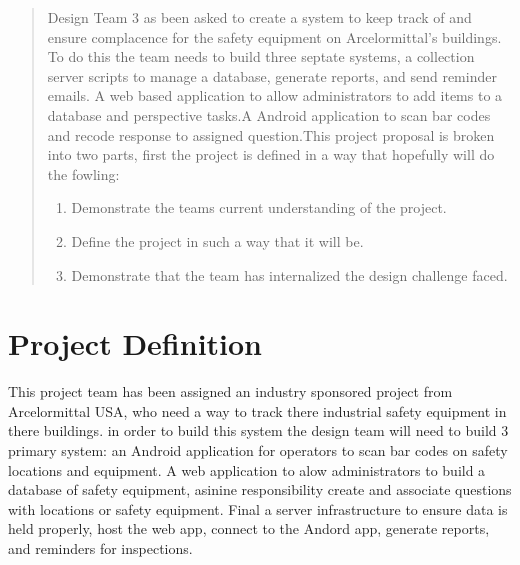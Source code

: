\documentclass[Letter,11pt]{article}
\begin{document}
	
	\begin{abstract}
		Design Team 3 as been asked to create a system to keep track of  and ensure complacence for the safety equipment on Arcelormittal's buildings. To do this the team needs to build three septate systems, a collection server scripts to manage a database, generate reports, and send reminder emails. A web based application to allow administrators to add items to a database and perspective tasks.A Android application to scan bar codes and recode response to assigned question.This project proposal is broken into two parts, first the project is defined in a way that hopefully will do the fowling:
		\begin{enumerate}
			\item Demonstrate the teams current understanding of the project.
			\item Define the project in such a way that it will be.
			\item Demonstrate that the team has internalized the design challenge faced.
		\end{enumerate}
	\end{abstract}

\section{Project Definition}\label{def}
	This project team has been assigned an industry sponsored project from Arcelormittal USA, who need a way to track there industrial safety equipment in there buildings. in order to build this system the design team will need to build 3 primary system: an Android application for operators to scan bar codes on safety locations and equipment. A web application to alow administrators to build a database of safety equipment, asinine responsibility create and associate questions with locations or safety equipment. Final a server infrastructure to ensure data is held properly, host the web app, connect to the Andord app, generate reports, and reminders for inspections. 
\end{document}
